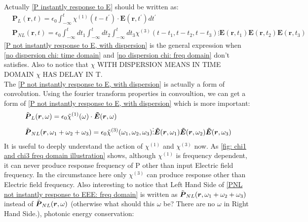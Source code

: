 \documentclass[12pt]{extarticle}
\numberwithin{equation}{section}
\numberwithin{figure}{section}
\numberwithin{table}{section}
\newcommand{\<}{\langle}
\renewcommand{\>}{\rangle}
\theoremstyle{definition}
\begin{document}
\begin{itemize}
                Actually \autoref{P instantly response to E} should be written as:
                \begin{subequations}
                    \begin{align}
                        &\boldsymbol{P}_L(\boldsymbol{r},t)=\epsilon_0\int_{-\infty}^t \chi^{(1)}(t-t^{'})\cdot\boldsymbol{E}(\boldsymbol{r},t^{'})dt^{'}\label{P not instantly response to E, with dispersion: linear part}\\
                        &\boldsymbol{P}_{NL}(\boldsymbol{r},t)=\epsilon_0\int_{-\infty}^t dt_1\int_{-\infty}^t dt_2\int_{-\infty}^t dt_3 \chi^{(3)}(t-t_1,t-t_2,t-t_3)\vdots \boldsymbol{E}(\boldsymbol{r},t_1)\boldsymbol{E}(\boldsymbol{r},t_2)\boldsymbol{E}(\boldsymbol{r},t_3)\label{P not instantly response to E, with dispersion: nonlinear part}
                    \end{align}
                    \label{P not instantly response to E, with dispersion}
                \end{subequations}
                \autoref{P not instantly response to E, with dispersion} is the general expression when \autoref{no dispersion chi: time domain} and \autoref{no dispersion chi: freq domain} don't satisfies. Also to notice that $\chi$ \MakeUppercase{with dispersion means in time domain} $\chi$ \MakeUppercase{has delay in t}. \\The \autoref{P not instantly response to E, with dispersion} is actually a form of convolution. Using the fourier transform properties in convoultion, we can get a form of \autoref{P not instantly response to E, with dispersion} which is more important:
                \begin{subequations}
                \begin{align}
                    &\Tilde{\boldsymbol{P}}_L(\boldsymbol{r},\omega)=\epsilon_0 \Tilde{\chi}^{(1)}(\omega)\cdot \boldsymbol{\Tilde{E}}(\boldsymbol{r},\omega)\label{PL not instantly response to E: freq domain}\\
                    &\Tilde{\boldsymbol{P}}_{NL}(\boldsymbol{r},\omega_1+\omega_2+\omega_3)=\epsilon_0 \Tilde{\chi}^{(3)}(\omega_1,\omega_2,\omega_3)\vdots \boldsymbol{\Tilde{E}}(\boldsymbol{r},\omega_1)\boldsymbol{\Tilde{E}}(\boldsymbol{r},\omega_2)\boldsymbol{\Tilde{E}}(\boldsymbol{r},\omega_3)\label{PNL not instantly response to EEE: freq domain}
                \end{align}
                \end{subequations}
                It is useful to deeply understand the action of $\chi^{(1)}$ and $\chi^{(3)}$ now. As \autoref{fig: chi1 and chi3 freq domain illustration} shows, although $\chi^{(1)}$ is frequency dependent, it can never produce response frequency of P other than input Electric field frequency. In the circumstance here only $\chi^{(3)}$ can produce response other than Electric field frequency. Also interesting to notice that Left Hand Side of \autoref{PNL not instantly response to EEE: freq domain} is written as $\Tilde{\boldsymbol{P}}_{NL}(\boldsymbol{r},\omega_1+\omega_2+\omega_3)$ instead of $\Tilde{\boldsymbol{P}}_{NL}(\boldsymbol{r},\omega)$ (otherwise what should this $\omega$ be? There are no $\omega$ in Right Hand Side.), photonic energy conservation:

\end{itemize}
\end{document}
